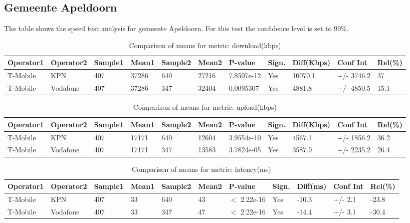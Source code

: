 \documentclass[]{article}
\begin{document}
\normalsize

\newpage

\subsection{Gemeente Apeldoorn}\label{gemeente-apeldoorn}

The table shows the speed test analysis for gemeente Apeldoorn. For this
test the confidence level is set to 99\%.

\begin{table}[ht]
\centering
{\footnotesize
\begin{tabular}{lllllllllll}
  \hline
Operator1 & Operator2 & Sample1 & Mean1 & Sample2 & Mean2 & P-value & Sign. & Diff(Kbps) & Conf Int & Rel(\%) \\ 
  \hline
T-Mobile & KPN & 407 & 37286 & 640 & 27216 & 7.8507e-12 & Yes & 10070.1 & +/- 3746.2 & 37 \\ 
  T-Mobile & Vodafone & 407 & 37286 & 347 & 32404 & 0.0095307 & Yes & 4881.8 & +/- 4850.5 & 15.1 \\ 
   \hline
\end{tabular}
}
\caption{Comparison of means for metric: download(kbps)} 
\end{table}\begin{table}[ht]
\centering
{\footnotesize
\begin{tabular}{lllllllllll}
  \hline
Operator1 & Operator2 & Sample1 & Mean1 & Sample2 & Mean2 & P-value & Sign. & Diff(Kbps) & Conf Int & Rel(\%) \\ 
  \hline
T-Mobile & KPN & 407 & 17171 & 640 & 12604 & 3.9554e-10 & Yes & 4567.1 & +/- 1856.2 & 36.2 \\ 
  T-Mobile & Vodafone & 407 & 17171 & 347 & 13583 & 3.7824e-05 & Yes & 3587.9 & +/- 2235.2 & 26.4 \\ 
   \hline
\end{tabular}
}
\caption{Comparison of means for metric: upload(kbps)} 
\end{table}\begin{table}[ht]
\centering
{\footnotesize
\begin{tabular}{lllllllllll}
  \hline
Operator1 & Operator2 & Sample1 & Mean1 & Sample2 & Mean2 & P-value & Sign. & Diff(ms) & Conf Int & Rel(\%) \\ 
  \hline
T-Mobile & KPN & 407 & 33 & 640 & 43 & $<$ 2.22e-16 & Yes & -10.3 & +/- 2.1 & -23.8 \\ 
  T-Mobile & Vodafone & 407 & 33 & 347 & 47 & $<$ 2.22e-16 & Yes & -14.4 & +/- 3.1 & -30.4 \\ 
   \hline
\end{tabular}
}
\caption{Comparison of means for metric: latency(ms)} 
\end{table}
\end{document}
